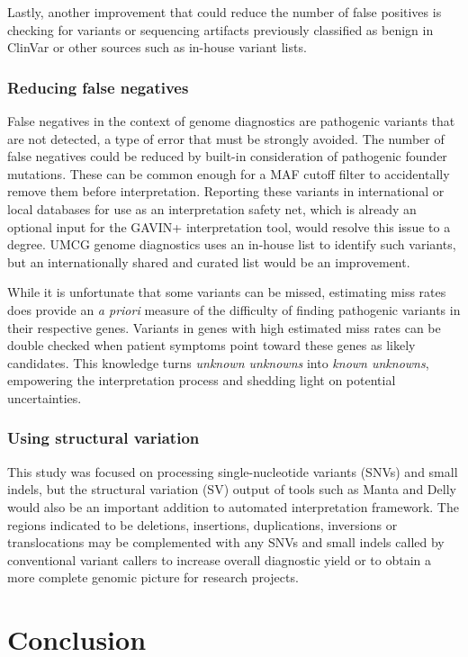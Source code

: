 Lastly, another improvement that could reduce the number of false positives is checking for variants or sequencing artifacts previously classified as benign in ClinVar or other sources such as in-house variant lists.

\subsubsection{Reducing false negatives}
False negatives in the context of genome diagnostics are pathogenic variants that are not detected, a type of error that must be strongly avoided.
The number of false negatives could be reduced by built-in consideration of pathogenic founder mutations.
These can be common enough for a MAF cutoff filter to accidentally remove them before interpretation.
Reporting these variants in international or local databases for use as an interpretation safety net, which is already an optional input for the GAVIN+ interpretation tool, would resolve this issue to a degree.
UMCG genome diagnostics uses an in-house list to identify such variants, but an internationally shared and curated list would be an improvement.

While it is unfortunate that some variants can be missed, estimating miss rates does provide an \textsl{a priori} measure of the difficulty of finding pathogenic variants in their respective genes.
Variants in genes with high estimated miss rates can be double checked when patient symptoms point toward these genes as likely candidates.
This knowledge turns \textsl{unknown unknowns} into \textsl{known unknowns}, empowering the interpretation process and shedding light on potential uncertainties.

\subsubsection{Using structural variation}
This study was focused on processing single-nucleotide variants (SNVs) and small indels, but the structural variation (SV) output of tools such as Manta\cite{Chen_2015} and Delly\cite{Rausch_2012} would also be an important addition to automated interpretation framework.
The regions indicated to be deletions, insertions, duplications, inversions or translocations may be complemented with any SNVs and small indels called by conventional variant callers to increase overall diagnostic yield or to obtain a more complete genomic picture for research projects.

\section{Conclusion}

